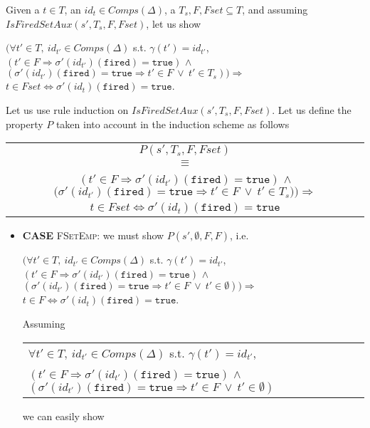 \documentclass[dvipsnames,12pt]{article}
\begin{document}
\begin{niproof}
  Given a $t\in{}T$, an $id_t\in{}Comps(\Delta)$, a
  $T_s,F,Fset\subseteq{}T$, and assuming\\
  $IsFiredSetAux(s',T_s,F,Fset)$, let us show
  \begin{frameb}
    $\big(\forall{}t'\in{}T,~id_{t'}\in{}Comps(\Delta)$
    s.t. $\gamma(t')=id_{t'}$,\\
    $(t'\in{}F\Rightarrow\sigma'(id_{t'})(\texttt{fired})=\mathtt{true})$
    $\land$
    $(\sigma'(id_{t'})(\texttt{fired})=\mathtt{true}\Rightarrow{}t'\in{}F~\lor~{}t'\in{}T_s)\big)\Rightarrow$
    $t\in{}Fset\Leftrightarrow\sigma'(id_t)(\texttt{fired})=\mathtt{true}$.
  \end{frameb}

  Let us use rule induction on $IsFiredSetAux(s',T_s,F,Fset)$. Let us
  define the property $P$ taken into account in the induction scheme
  as follows

  \begin{center}
    \begin{tabular}{c}
      $P(s',T_s,F,Fset)$ \\
      $\equiv$ \\
      $(t'\in{}F\Rightarrow\sigma'(id_{t'})(\texttt{fired})=\mathtt{true})$
      $\land$
      $\big(\sigma'(id_{t'})(\texttt{fired})=\mathtt{true}\Rightarrow{}t'\in{}F~\lor~{}t'\in{}T_s)\big)\Rightarrow$ \\
      $t\in{}Fset\Leftrightarrow\sigma'(id_t)(\texttt{fired})=\mathtt{true}$ \\
    \end{tabular}
  \end{center}

  \begin{itemize}
  \item \textbf{CASE} \textsc{FSetEmp}: we must show $P(s',\emptyset,F,F)$, i.e.
    \begin{frameb}
      $\big(\forall{}t'\in{}T,~id_{t'}\in{}Comps(\Delta)$
      s.t. $\gamma(t')=id_{t'}$,\\
      $(t'\in{}F\Rightarrow\sigma'(id_{t'})(\texttt{fired})=\mathtt{true})$
      $\land$
      $(\sigma'(id_{t'})(\texttt{fired})=\mathtt{true}\Rightarrow{}t'\in{}F~\lor~{}t'\in{}\emptyset)\big)\Rightarrow$
      $t\in{}F\Leftrightarrow\sigma'(id_t)(\texttt{fired})=\mathtt{true}$.
    \end{frameb}
    
    Assuming
    \begin{center}
      \begin{tabular}{l}
        $\forall{}t'\in{}T,~id_{t'}\in{}Comps(\Delta)$
        s.t. $\gamma(t')=id_{t'}$,\\
        $(t'\in{}F\Rightarrow\sigma'(id_{t'})(\texttt{fired})=\mathtt{true})$
        $\land$
        $(\sigma'(id_{t'})(\texttt{fired})=\mathtt{true}\Rightarrow{}t'\in{}F~\lor~{}t'\in{}\emptyset)$ \\
      \end{tabular}
    \end{center}
    we can easily show
    

\end{itemize}
\end{niproof}
\end{document}
